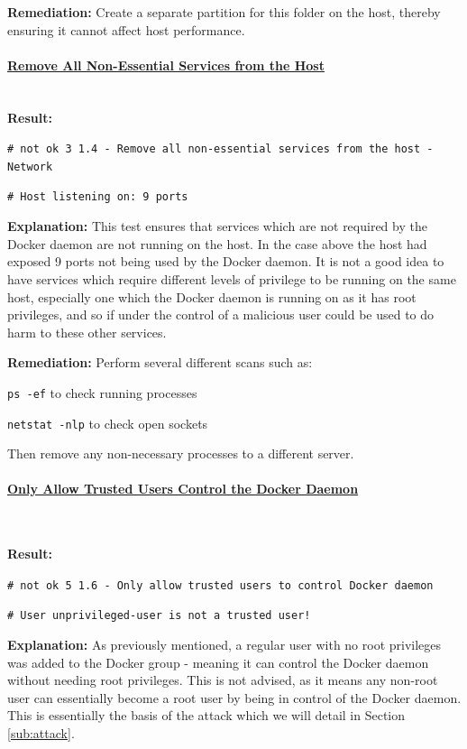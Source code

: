 \documentclass{article}
\begin{document}
\textbf{Remediation:} Create a separate partition for this folder on the host, thereby ensuring it cannot affect host performance.

\paragraph{\underline{Remove All Non-Essential Services from the Host}}\mbox{}\\

\textbf{Result:} 

\texttt{\# not ok 3 1.4  - Remove all non-essential services from the host - Network}

\texttt{\# Host listening on: 9 ports}

\textbf{Explanation:} This test ensures that services which are not required by the Docker daemon are not running on the host. In the case above the host had exposed 9 ports not being used by the Docker daemon. It is not a good idea to have services which require different levels of privilege to be running on the same host, especially one which the Docker daemon is running on as it has root privileges, and so if under the control of a malicious user could be used to do harm to these other services.

\textbf{Remediation:} Perform several different scans such as:

\texttt{ps -ef} to check running processes

\texttt{netstat -nlp} to check open sockets

Then remove any non-necessary processes to a different server.

\paragraph{\underline{Only Allow Trusted Users Control the Docker Daemon}}\mbox{}\\
\label{par:untrusted}

\textbf{Result:} 

\texttt{\# not ok 5 1.6  - Only allow trusted users to control Docker daemon}

\texttt{\# User unprivileged-user is not a trusted user!}

\textbf{Explanation:} As previously mentioned, a regular user with no root privileges was added to the Docker group - meaning it can control the Docker daemon without needing root privileges. This is not advised, as it means any non-root user can essentially become a root user by being in control of the Docker daemon. This is essentially the basis of the attack which we will detail in Section \ref{sub:attack}.
\end{document}
